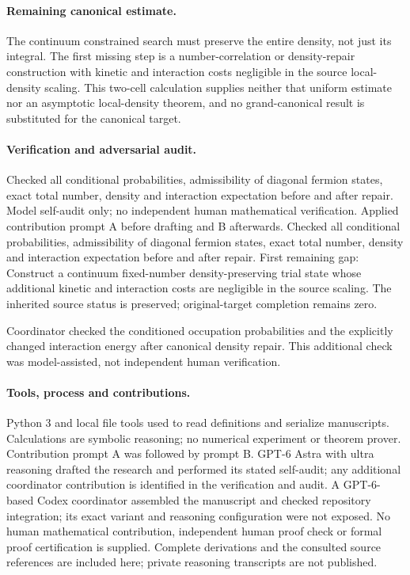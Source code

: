 \documentclass[11pt]{article}
\begin{document}
\paragraph{Remaining canonical estimate.} The continuum constrained search must preserve the entire density, not just its integral. The first missing step is a number-correlation or density-repair construction with kinetic and interaction costs negligible in the source local-density scaling. This two-cell calculation supplies neither that uniform estimate nor an asymptotic local-density theorem, and no grand-canonical result is substituted for the canonical target.

\paragraph{Verification and adversarial audit.}
Checked all conditional probabilities, admissibility of diagonal fermion states, exact total number, density and interaction expectation before and after repair. Model self-audit only; no independent human mathematical verification. Applied contribution prompt A before drafting and B afterwards. Checked all conditional probabilities, admissibility of diagonal fermion states, exact total number, density and interaction expectation before and after repair. First remaining gap: Construct a continuum fixed-number density-preserving trial state whose additional kinetic and interaction costs are negligible in the source scaling. The inherited source status is preserved; original-target completion remains zero.

Coordinator checked the conditioned occupation probabilities and the explicitly changed interaction energy after canonical density repair. This additional check was model-assisted, not independent human verification.

\paragraph{Tools, process and contributions.}
Python 3 and local file tools used to read definitions and serialize manuscripts. Calculations are symbolic reasoning; no numerical experiment or theorem prover. Contribution prompt A was followed by prompt B. GPT-6 Astra with ultra reasoning drafted the research and performed its stated self-audit; any additional coordinator contribution is identified in the verification and audit. A GPT-6-based Codex coordinator assembled the manuscript and checked repository integration; its exact variant and reasoning configuration were not exposed. No human mathematical contribution, independent human proof check or formal proof certification is supplied. Complete derivations and the consulted source references are included here; private reasoning transcripts are not published.
\end{document}
